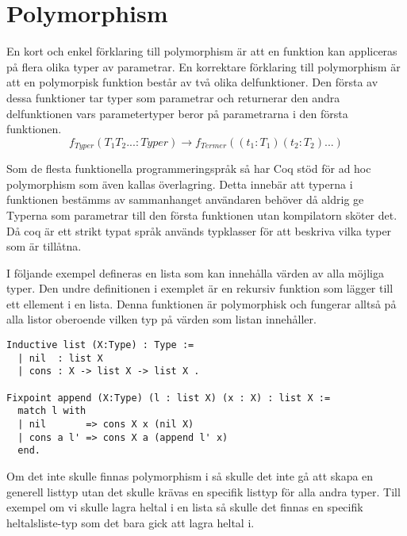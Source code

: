 \section{Polymorphism}
En kort och enkel förklaring till polymorphism är att en funktion kan appliceras
på flera olika typer av parametrar.
En korrektare förklaring till polymorphism är att en polymorpisk funktion
består av två olika delfunktioner. Den första av dessa funktioner tar
typer som parametrar och returnerar den andra delfunktionen vars parametertyper
beror på parametrarna i den första funktionen.
\begin{equation}
f_{Typer}(T_1 T_2 ... : Typer)
\rightarrow f_{Termer}((t_1 : T_1) (t_2 : T_2) ...)
\end{equation}

Som de flesta funktionella programmeringspråk så har Coq stöd för ad hoc
polymorphism som även kallas överlagring. Detta innebär att typerna i
funktionen bestämms av sammanhanget användaren behöver då aldrig ge
Typerna som parametrar till den första funktionen utan kompilatorn sköter
det.
Då coq är ett strikt typat språk används
typklasser för att beskriva vilka typer som är tillåtna.

I följande exempel defineras en lista som kan innehålla värden av alla möjliga
typer. Den undre definitionen i exemplet är en rekursiv funktion som lägger till
ett ellement i en lista. Denna funktionen är polymorphisk och fungerar alltså på
alla listor oberoende vilken typ på värden som listan innehåller.
\begin{lstlisting}
Inductive list (X:Type) : Type :=
  | nil  : list X
  | cons : X -> list X -> list X .

Fixpoint append (X:Type) (l : list X) (x : X) : list X :=
  match l with
  | nil       => cons X x (nil X)
  | cons a l' => cons X a (append l' x)
  end.
\end{lstlisting}

Om det inte skulle finnas polymorphism i \coq så skulle det inte
gå att skapa en generell listtyp utan det skulle krävas en specifik
listtyp för alla andra typer. Till exempel om vi skulle lagra heltal
i en lista så skulle det finnas en specifik heltalsliste-typ som det bara
gick att lagra heltal i.

